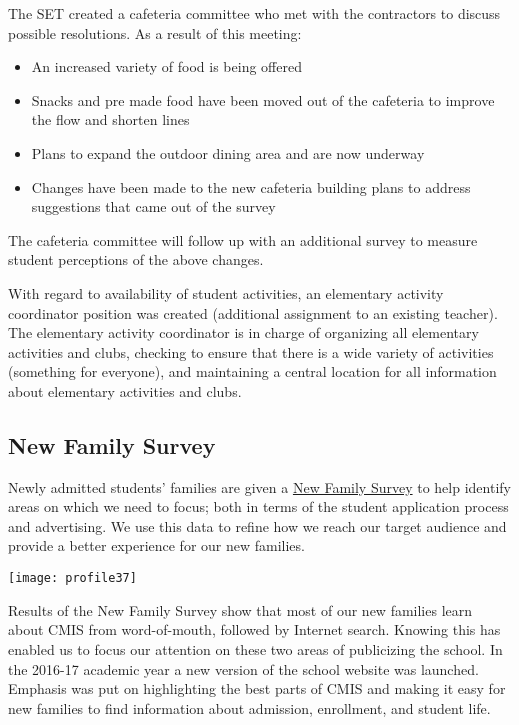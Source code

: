 The SET created a cafeteria committee who met with the contractors to discuss possible resolutions. As a result of this meeting:
\begin{itemize}
\item An increased variety of food is being offered
\item Snacks and pre made food  have been moved out of the cafeteria to improve the flow and shorten lines
\item Plans to expand the outdoor dining area and are now underway
\item Changes have been made to the new cafeteria building plans to address suggestions that came out of the survey 
\end{itemize}

The cafeteria committee will follow up with an additional survey to measure student perceptions of the above changes.

With regard to availability of student activities, an elementary activity coordinator position was created (additional assignment to an existing teacher).  The elementary activity coordinator is in charge of organizing all elementary activities and clubs, checking to ensure that there is a wide variety of activities (something for everyone), and maintaining a central location for all information about elementary activities and clubs.

\subsection{New Family Survey}

Newly admitted students’ families are given a \href{https://docs.google.com/a/cmis.ac.th/forms/d/1basukpCBjcCMWXDh-cUUWW6lgk6zxYadGMn1EzFDQwc/viewanalytics}{New Family Survey} to help identify areas on which we need to focus; both in terms of the student application process and advertising. We use this data to refine how we reach our target audience and provide a better experience for our new families.

\texttt{[image: profile37]}

Results of the New Family Survey show that most of our new families learn about CMIS from word-of-mouth, followed by Internet search. Knowing this has enabled us to focus our attention on these two areas of publicizing the school. In the 2016-17 academic year a new version of the school website was launched. Emphasis was put on highlighting the best parts of CMIS and making it easy for new families to find information about admission, enrollment, and student life.

